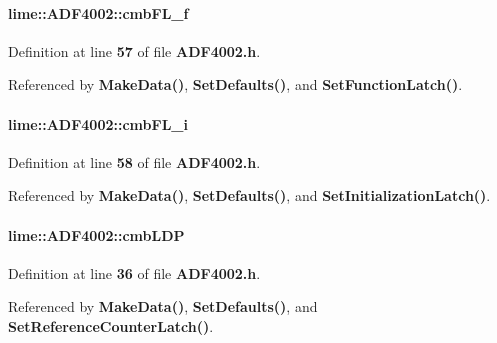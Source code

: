 \paragraph[{cmb\+F\+L\+\_\+f}]{ lime\+::\+A\+D\+F4002\+::cmb\+F\+L\+\_\+f}\label{classlime_1_1ADF4002_af7368828e5b915a8816301124f8fd9be}


Definition at line {\bf 57} of file {\bf A\+D\+F4002.\+h}.



Referenced by {\bf Make\+Data()}, {\bf Set\+Defaults()}, and {\bf Set\+Function\+Latch()}.

\paragraph[{cmb\+F\+L\+\_\+i}]{ lime\+::\+A\+D\+F4002\+::cmb\+F\+L\+\_\+i}\label{classlime_1_1ADF4002_a99c5580539f5614a1edef5deef6f7e5a}


Definition at line {\bf 58} of file {\bf A\+D\+F4002.\+h}.



Referenced by {\bf Make\+Data()}, {\bf Set\+Defaults()}, and {\bf Set\+Initialization\+Latch()}.

\paragraph[{cmb\+L\+DP}]{ lime\+::\+A\+D\+F4002\+::cmb\+L\+DP}\label{classlime_1_1ADF4002_a58446f527b797b1d957ed2012662deaa}


Definition at line {\bf 36} of file {\bf A\+D\+F4002.\+h}.



Referenced by {\bf Make\+Data()}, {\bf Set\+Defaults()}, and {\bf Set\+Reference\+Counter\+Latch()}.

